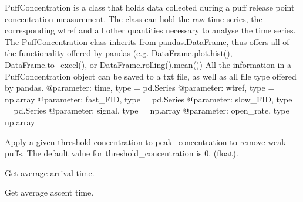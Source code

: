\documentclass[letterpaper,10pt,english]{sphinxmanual}
\begin{document}
\begin{fulllineitems}
\label{\detokenize{index:windtunnel.PuffConcentration}}
PuffConcentration is a class that holds data collected during 
a puff release point concentration measurement. The class can hold
the raw time series, the corresponding wtref and all other quantities
necessary to analyse the time series. The PuffConcentration class
inherits from pandas.DataFrame, thus offers all of the functionality
offered by pandas (e.g. DataFrame.plot.hist(), DataFrame.to\_excel(),
or DataFrame.rolling().mean()) All the information in a
PuffConcentration object can be saved to a txt file, as well as all
file type offered by pandas.
@parameter: time, type = pd.Series
@parameter: wtref, type = np.array
@parameter: fast\_FID, type = pd.Series
@parameter: slow\_FID, type = pd.Series
@parameter: signal, type = np.array
@parameter: open\_rate, type = np.array

\begin{fulllineitems}
\label{\detokenize{index:windtunnel.PuffConcentration.apply_threshold_concentration}}
Apply a given threshold concentration to peak\_concentration to 
remove weak puffs. The default value for threshold\_concentration 
is 0. (float).

\end{fulllineitems}


\begin{fulllineitems}
\label{\detokenize{index:windtunnel.PuffConcentration.avg_arrival_time}}
Get average arrival time.

\end{fulllineitems}


\begin{fulllineitems}
\label{\detokenize{index:windtunnel.PuffConcentration.avg_ascent_time}}
Get average ascent time.


\end{fulllineitems}
\end{fulllineitems}
\end{document}

